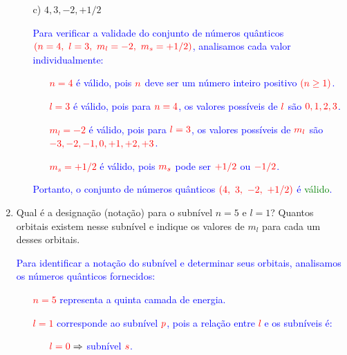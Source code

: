 \documentclass[a4paper, 12pt]{article}
\begin{document}
\begin{enumerate}
\begin{enumerate}
		      \item[c)] \(4, 3, -2, +1/2\)
		            \\[10pt]
		            \textcolor{blue}{
			            Para verificar a validade do conjunto de números quânticos \(\textcolor{red}{(n = 4,\ l = 3,\ m_l = -2,\ m_s = +1/2)}\), analisamos cada valor individualmente:
			            \begin{itemize}
				            \item[] \textcolor{red}{\(n = 4\)} é válido, pois \(\textcolor{red}{n}\) deve ser um número inteiro positivo \(\textcolor{red}{(n \geq 1)}\).
				            \item[] \textcolor{red}{\(l = 3\)} é válido, pois para \(\textcolor{red}{n = 4}\), os valores possíveis de \(\textcolor{red}{l}\) são \(\textcolor{red}{0, 1, 2, 3}\).
				            \item[] \textcolor{red}{\(m_l = -2\)} é válido, pois para \(\textcolor{red}{l = 3}\), os valores possíveis de \(\textcolor{red}{m_l}\) são \(\textcolor{red}{-3, -2, -1, 0, +1, +2, +3}\).
				            \item[] \textcolor{red}{\(m_s = +1/2\)} é válido, pois \(\textcolor{red}{m_s}\) pode ser \(\textcolor{red}{+1/2}\) ou \(\textcolor{red}{-1/2}\).
			            \end{itemize}
			            \textcolor{blue}{Portanto, o conjunto de números quânticos \(\textcolor{red}{(4,\ 3,\ -2,\ +1/2)}\) é \textcolor{green}{válido}.}
		            }
	      \end{enumerate}
	      \pagebreak
	\item Qual é a designação (notação) para o subnível \(n = 5\) e \(l = 1\)? Quantos orbitais existem nesse subnível e indique os valores de \(m_l\) para cada um desses orbitais.
	      \\[10pt]
	      \textcolor{blue}{
		      Para identificar a notação do subnível e determinar seus orbitais, analisamos os números quânticos fornecidos:
		      \begin{itemize}
			      \item[] \textcolor{red}{\(n = 5\)} representa a quinta camada de energia.
			      \item[] \textcolor{red}{\(l = 1\)} corresponde ao subnível \(\textcolor{red}{p}\), pois a relação entre \textcolor{red}{\(l\)} e os subníveis é:
			            \begin{itemize}
				            \item[] \(\textcolor{red}{l = 0} \Rightarrow\) subnível \(\textcolor{red}{s}\).

\end{itemize}
\end{itemize}}
\end{enumerate}
\end{document}
